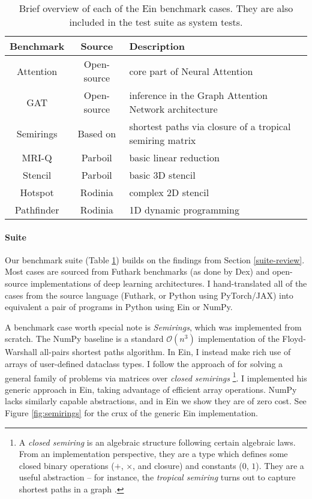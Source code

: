\begin{table}[b]
    \centering
    \begin{tabular}{c|c|l}
       \textbf{Benchmark} & \textbf{Source} & \textbf{Description} \\ \hline
        Attention & Open-source & core part of Neural Attention \\
        GAT & Open-source & inference in the Graph Attention Network architecture \\
        Semirings & Based on \textcite{dolan2013fun} & shortest paths via closure of a tropical semiring matrix \\
        MRI-Q & Parboil & basic linear reduction \\
        Stencil & Parboil & basic 3D stencil \\
        Hotspot & Rodinia & complex 2D stencil \\
        Pathfinder & Rodinia & 1D dynamic programming 
    \end{tabular}
    \caption{Brief overview of each of the Ein benchmark cases. They are also included in the test suite as system tests.}
    \label{tab:benchmarks}
\end{table}


\paragraph{Suite} Our benchmark suite (Table \ref{tab:benchmarks}) builds on the findings from Section \ref{suite-review}. 
Most cases are sourced from Futhark benchmarks \cite{The_Futhark_Hackers_futhark-benchmarks} (as done by Dex) and open-source implementations of deep learning architectures.
I hand-translated all of the cases from the source language (Futhark, or Python using PyTorch/JAX) into equivalent a pair of programs in Python using Ein or NumPy.

A benchmark case worth special note is \textit{Semirings}, which was implemented from scratch. 
The NumPy baseline is a standard $\mathcal O(n^3)$ implementation of the Floyd-Warshall all-pairs shortest paths algorithm. 
In Ein, I instead make rich use of arrays of user-defined dataclass types. 
I follow the approach of \textcite{dolan2013fun} for solving a general family of problems via matrices over \textit{closed semirings}%
\footnote{A \textit{closed semiring} is an algebraic structure following certain algebraic laws.
From an implementation perspective, they are a type which defines some closed binary operations ($+$, $\times$, and closure) and constants ($0$, $1$).
They are a useful abstraction -- for instance, the \textit{tropical semiring} turns out to capture shortest paths in a graph \cite{lehmann1977algebraic}.}.
I implemented his generic approach in Ein, taking advantage of efficient array operations.
NumPy lacks similarly capable abstractions, and in Ein we show they are of zero cost.
See Figure \ref{fig:semirings} for the crux of the generic Ein implementation.

